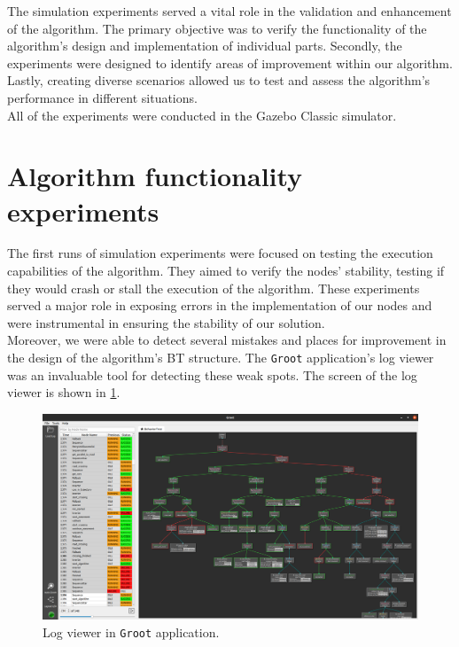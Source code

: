 The simulation experiments served a vital role in the validation and enhancement of the algorithm. The primary objective was to verify the functionality of the algorithm's design and implementation of individual parts. Secondly, the experiments were designed to identify areas of improvement within our algorithm. Lastly, creating diverse scenarios allowed us to test and assess the algorithm's performance in different situations.\\
All of the experiments were conducted in the Gazebo Classic simulator.
\section{Algorithm functionality experiments}
    The first runs of simulation experiments were focused on testing the execution capabilities of the algorithm. They aimed to verify the nodes' stability, testing if they would crash or stall the execution of the algorithm. These experiments served a major role in exposing errors in the implementation of our nodes and were instrumental in ensuring the stability of our solution.\\
    Moreover, we were able to detect several mistakes and places for improvement in the design of the algorithm's BT structure. The \texttt{Groot} application's log viewer was an invaluable tool for detecting these weak spots. The screen of the log viewer is shown in \ref{fig:log_viewer}.
    \begin{figure}[ht]
        \centering
        \includegraphics[width=\linewidth]{images/log_viewer.png}
        \caption{Log viewer in \texttt{Groot} application.}
        \label{fig:log_viewer}
    \end{figure}

